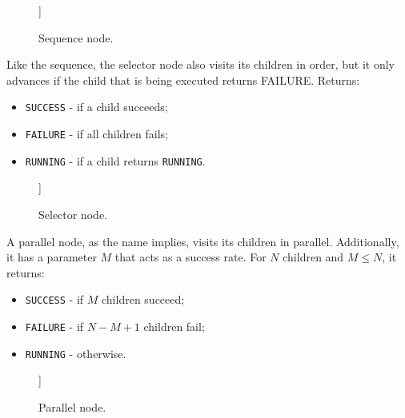 \documentclass[a4paper,UKenglish,cleveref, autoref, thm-restate]{oasics-v2019}
\begin{document}
\begin{figure}[H]
    \centering
    \begin{behavior}
        [\sequence
            [\action{Child 1}]
            [\action{Child 2}]
            [{\textbf{. . .}}, inner sep=10pt]
            [\action{Child N}]
        ]
    \end{behavior}
    \caption{Sequence node.}
    \label{fig:sequence}
\end{figure}

Like the sequence, the selector node also visits its children in order, but it only advances if the child that is being executed returns FAILURE.
Returns:
\begin{itemize}
    \item \texttt{SUCCESS} - if a child succeeds;
    \item \texttt{FAILURE} - if all children fails;
    \item \texttt{RUNNING} - if a child returns \texttt{RUNNING}.
\end{itemize}

\begin{figure}[H]
    \centering
    \begin{behavior}
        [\selector
            [\action{Child 1}]
            [\action{Child 2}]
            [{\textbf{. . .}}, inner sep=10pt]
            [\action{Child N}]
        ]
    \end{behavior}
    \caption{Selector node.}
    \label{fig:selector}
\end{figure}


A parallel node, as the name implies, visits its children in parallel.
Additionally, it has a parameter $M$ that acts as a success rate.
For $N$ children and $M \leq N$, it returns:
\begin{itemize}
    \item \texttt{SUCCESS} - if $M$ children succeed;
    \item \texttt{FAILURE} - if $N - M + 1$ children fail;
    \item \texttt{RUNNING} - otherwise.
\end{itemize}

\begin{figure}[H]
    \centering
    \begin{behavior}
        [\parallel{M}
            [\action{Child 1}]
            [\action{Child 2}]
            [{\textbf{. . .}}, inner sep=10pt]
            [\action{Child N}]
        ]
    \end{behavior}
    \caption{Parallel node.}
    \label{fig:parallel}
\end{figure}
\end{document}
